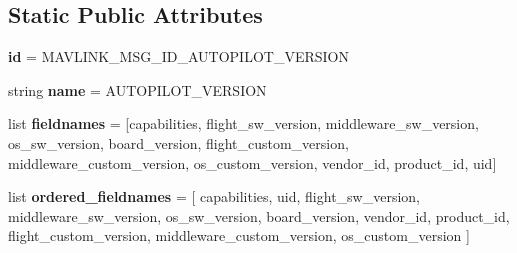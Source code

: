 \subsection*{Static Public Attributes}
\begin{DoxyCompactItemize}
\item 
\mbox{\label{classpymavlink_1_1dialects_1_1v10_1_1MAVLink__autopilot__version__message_a130a3bfa1eea85813df3bab82fc8c53c}} 
{\bfseries id} = M\+A\+V\+L\+I\+N\+K\+\_\+\+M\+S\+G\+\_\+\+I\+D\+\_\+\+A\+U\+T\+O\+P\+I\+L\+O\+T\+\_\+\+V\+E\+R\+S\+I\+ON
\item 
\mbox{\label{classpymavlink_1_1dialects_1_1v10_1_1MAVLink__autopilot__version__message_ab0fb895ed60ec00e31a8f30e62400ffc}} 
string {\bfseries name} = \textquotesingle{}A\+U\+T\+O\+P\+I\+L\+O\+T\+\_\+\+V\+E\+R\+S\+I\+ON\textquotesingle{}
\item 
\mbox{\label{classpymavlink_1_1dialects_1_1v10_1_1MAVLink__autopilot__version__message_a56adf54d5aff8325b73943d49be805f1}} 
list {\bfseries fieldnames} = \mbox{[}\textquotesingle{}capabilities\textquotesingle{}, \textquotesingle{}flight\+\_\+sw\+\_\+version\textquotesingle{}, \textquotesingle{}middleware\+\_\+sw\+\_\+version\textquotesingle{}, \textquotesingle{}os\+\_\+sw\+\_\+version\textquotesingle{}, \textquotesingle{}board\+\_\+version\textquotesingle{}, \textquotesingle{}flight\+\_\+custom\+\_\+version\textquotesingle{}, \textquotesingle{}middleware\+\_\+custom\+\_\+version\textquotesingle{}, \textquotesingle{}os\+\_\+custom\+\_\+version\textquotesingle{}, \textquotesingle{}vendor\+\_\+id\textquotesingle{}, \textquotesingle{}product\+\_\+id\textquotesingle{}, \textquotesingle{}uid\textquotesingle{}\mbox{]}
\item 
\mbox{\label{classpymavlink_1_1dialects_1_1v10_1_1MAVLink__autopilot__version__message_a19d95265f76428758491c303ca8f5503}} 
list {\bfseries ordered\+\_\+fieldnames} = \mbox{[} \textquotesingle{}capabilities\textquotesingle{}, \textquotesingle{}uid\textquotesingle{}, \textquotesingle{}flight\+\_\+sw\+\_\+version\textquotesingle{}, \textquotesingle{}middleware\+\_\+sw\+\_\+version\textquotesingle{}, \textquotesingle{}os\+\_\+sw\+\_\+version\textquotesingle{}, \textquotesingle{}board\+\_\+version\textquotesingle{}, \textquotesingle{}vendor\+\_\+id\textquotesingle{}, \textquotesingle{}product\+\_\+id\textquotesingle{}, \textquotesingle{}flight\+\_\+custom\+\_\+version\textquotesingle{}, \textquotesingle{}middleware\+\_\+custom\+\_\+version\textquotesingle{}, \textquotesingle{}os\+\_\+custom\+\_\+version\textquotesingle{} \mbox{]}

\end{DoxyCompactItemize}
